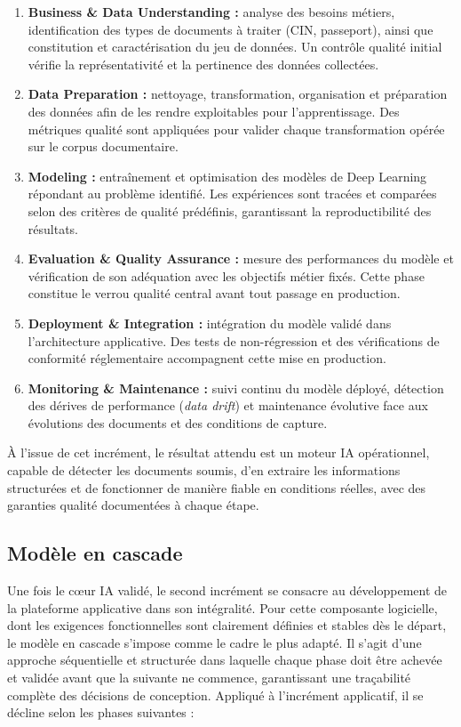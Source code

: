 \begin{enumerate}
  \item \textbf{Business \& Data Understanding :} analyse des besoins métiers, identification des types de documents à traiter (CIN, passeport), ainsi que constitution et caractérisation du jeu de données. Un contrôle qualité initial vérifie la représentativité et la pertinence des données collectées.
  \item \textbf{Data Preparation :} nettoyage, transformation, organisation et préparation des données afin de les rendre exploitables pour l'apprentissage. Des métriques qualité sont appliquées pour valider chaque transformation opérée sur le corpus documentaire.
  \item \textbf{Modeling :} entraînement et optimisation des modèles de Deep Learning répondant au problème identifié. Les expériences sont tracées et comparées selon des critères de qualité prédéfinis, garantissant la reproductibilité des résultats.
  \item \textbf{Evaluation \& Quality Assurance :} mesure des performances du modèle et vérification de son adéquation avec les objectifs métier fixés. Cette phase constitue le verrou qualité central avant tout passage en production.
  \item \textbf{Deployment \& Integration :} intégration du modèle validé dans l'architecture applicative. Des tests de non-régression et des vérifications de conformité réglementaire accompagnent cette mise en production.
  \item \textbf{Monitoring \& Maintenance :} suivi continu du modèle déployé, détection des dérives de performance (\textit{data drift}) et maintenance évolutive face aux évolutions des documents et des conditions de capture.
\end{enumerate}

À l'issue de cet incrément, le résultat attendu est un moteur IA opérationnel, capable de détecter les documents soumis, d'en extraire les informations structurées et de fonctionner de manière fiable en conditions réelles, avec des garanties qualité documentées à chaque étape.

\subsection{Modèle en cascade}
\label{subsec:modele-cascade}

Une fois le c{\oe}ur IA validé, le second incrément se consacre au développement de la plateforme applicative dans son intégralité. Pour cette composante logicielle, dont les exigences fonctionnelles sont clairement définies et stables dès le départ, le modèle en cascade s'impose comme le cadre le plus adapté. Il s'agit d'une approche séquentielle et structurée dans laquelle chaque phase doit être achevée et validée avant que la suivante ne commence, garantissant une traçabilité complète des décisions de conception. Appliqué à l'incrément applicatif, il se décline selon les phases suivantes :

